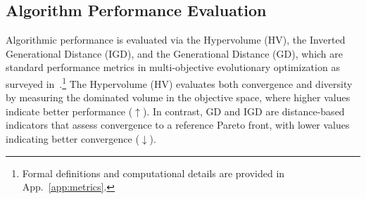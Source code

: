 \documentclass[a4paper,fleqn]{cas-sc}
\begin{document}
%
%

\subsection{Algorithm Performance Evaluation}

Algorithmic performance is evaluated via 
the Hypervolume (HV), the Inverted Generational Distance (IGD), and the Generational Distance (GD), which are standard performance metrics in multi-objective evolutionary optimization
as surveyed in~\citep{riquelme2015performance}.\footnote{Formal definitions and computational details are provided in App.~\ref{app:metrics}.}
The Hypervolume (HV) evaluates both convergence and diversity by measuring the dominated volume in the objective space, where higher values indicate better performance ($\uparrow$). In contrast, GD and IGD are distance-based indicators that assess convergence to a reference Pareto front, with lower values indicating better convergence ($\downarrow$).
\end{document}

